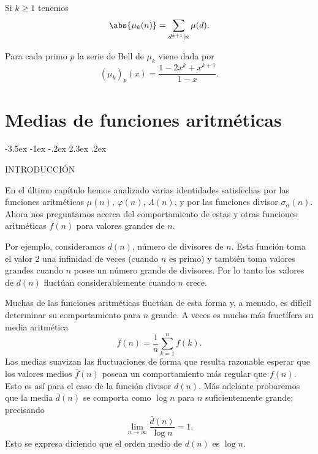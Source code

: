 \documentclass[12pt,a4paper]{book}
\makeatletter
\renewcommand\section{\@startsection{section}{1}{\z@}%
  {-3.5ex \@plus -1ex \@minus -.2ex}%
  {2.3ex \@plus .2ex}%
  {\normalfont\Large\bfseries\raggedright}}
\makeatother
\begin{document}
    \begin{ejercicio}
        Si $k\geq1$ tenemos
        \begin{equation*}
            \abs{\mu_{k}(n)}=\sum_{d^{k+1}\mid n}\mu(d).
        \end{equation*}
    \end{ejercicio}

    \begin{ejercicio}
        Para cada primo $p$ la serie de Bell de $\mu_{k}$ viene dada por
        \begin{equation*}
            (\mu_{k})_{p}(x)=\frac{1-2x^{k}+x^{k+1}}{1-x}.
        \end{equation*}
    \end{ejercicio}

\chapter{Medias de funciones aritméticas}

    \section{INTRODUCCIÓN}

    En el último capítulo hemos analizado varias identidades satisfechas por las funciones
    aritméticas $\mu(n)$, $\varphi(n)$, $\Lambda(n)$, y por las funciones divisor
    $\sigma_{\alpha}(n)$. Ahora nos preguntamos acerca del comportamiento de estas y otras
    funciones aritméticas $f(n)$ para valores grandes de $n$.

    Por ejemplo, consideramos $d(n)$, número de divisores de $n$. Esta función toma el
    valor 2 una infinidad de veces (cuando $n$ es primo) y también toma valores grandes
    cuando $n$ posee un número grande de divisores. Por lo tanto los valores de $d(n)$
    fluctúan considerablemente cuando $n$ crece.

    Muchas de las funciones aritméticas fluctúan de esta forma y, a menudo, es difícil
    determinar su comportamiento para $n$ grande. A veces es mucho más fructífera su media
    aritmética
    \begin{equation*}
        \bar{f}(n)=\frac{1}{n}\sum_{k=1}^{n}f(k).
    \end{equation*}
    Las medias suavizan las fluctuaciones de forma que resulta razonable esperar que los
    valores medios $\bar{f}(n)$ posean un comportamiento más regular que $f(n)$. Esto es así
    para el caso de la función divisor $d(n)$. Más adelante probaremos que la media
    $\bar{d}(n)$ se comporta como $\log n$ para $n$ suficientemente grande; precisando
    \begin{equation}
        \lim_{n\to\infty}\frac{\bar{d}(n)}{\log n}=1.
    \end{equation}
    Esto se expresa diciendo que el orden medio de $d(n)$ es $\log n$.
\end{document}
